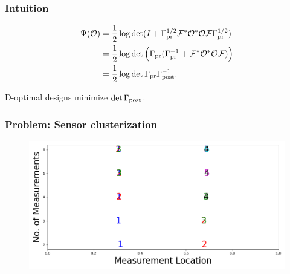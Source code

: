 \documentclass{beamer}
\begin{document}
\begin{frame}
  \frametitle{Intuition}
  \begin{align*}
  \begin{split}
    \Psi(\mathcal{O}) &= \frac12 \log \det ( I + \Gamma_{\textup{pr}}^{1/2}  \mathcal{F} ^* \mathcal{O}^* \mathcal{O} \mathcal{F} \Gamma_{\textup{pr}}^{1/2})\\ 
    &= \frac12 \log \det \Big( \Gamma_{\textup{pr}} ( \Gamma_{\textup{pr}}^{-1} +  \mathcal{F} ^* \mathcal{O}^* \mathcal{O} \mathcal{F}) \Big )\\
    &= \frac12 \log \det \Gamma_{\textup{pr}} \Gamma_{\textup{post}}^{-1}.
  \end{split}
  \end{align*}

  \pause D-optimal designs minimize $\det \Gamma_{\textup{post}}$.
\end{frame}



  



\begin{frame}
\frametitle{Problem: Sensor clusterization}
\begin{figure}
  \centering
  \includegraphics[height=0.5\textwidth]{dst_modelError0.png}
\end{figure}

\end{frame}
\end{document}
